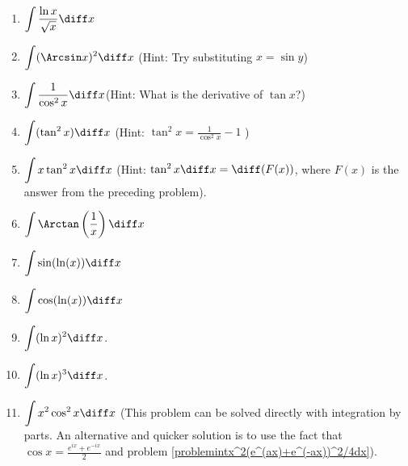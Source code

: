 \begin{multicols}{2}
\begin{enumerate}[ref={\fcProblemRef}]
\item $\displaystyle\int \frac{\ln x}{\sqrt{x}}\diff x $

\item \label{problemIntegrateArcsinSquared} $\displaystyle\int (\Arcsin x)^2 \diff x $ \quad \quad (Hint: Try substituting $x=\sin y$)


\item $\displaystyle\int \frac{1}{\cos^2 x}\diff x$\quad \quad (Hint: What is the derivative of $\tan x$?)

\item $\displaystyle\int (\tan^2 x) \diff x $ \quad \quad (Hint: $\tan^2 x = \frac{1}{\cos^2x }-1$ )


\item \label{problemintxtan^2xdx} $\displaystyle\int x \tan^2 x \diff x $ \quad \quad (Hint: $\tan^2 x \diff x= \diff (F(x))$, where $F(x)$ is the answer from the preceding problem).

\item 
$\displaystyle
\int\Arctan \left(\frac{1}x\right)\diff x
$
\item \label{problemintsin(ln x)dx}

$\displaystyle\int \sin (\ln (x)) \diff x $

\item 
$\displaystyle\int \cos (\ln (x)) \diff x $


\item $\displaystyle\int (\ln x)^2 \diff x$.
\item $\displaystyle\int (\ln x)^3 \diff x$.
\item $\displaystyle\int x^2\cos^2x \diff x$ (This problem can be solved directly with integration by parts. An alternative and quicker solution is to use the fact that $\cos x= \frac{ e^{ix} + e^{-ix}}{2}$ and problem \ref{problemintx^2(e^(ax)+e^(-ax))^2/4dx}).
\end{enumerate}
\end{multicols}

